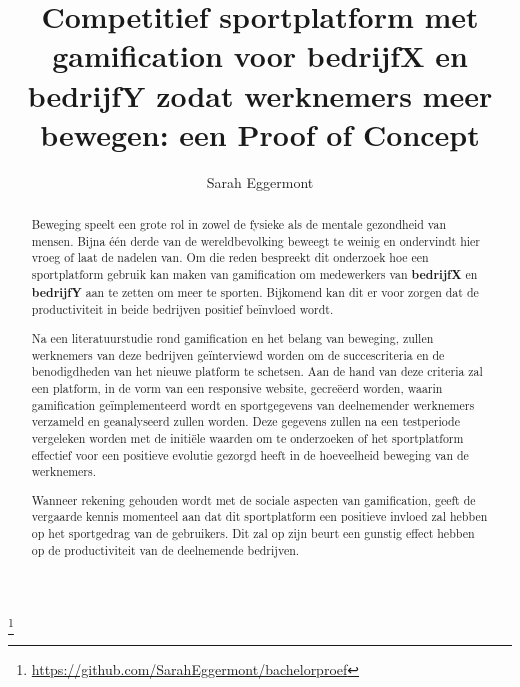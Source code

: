 \documentclass{hogent-article}
\title{Competitief sportplatform met gamification voor \textbf{bedrijfX} en \textbf{bedrijfY} zodat werknemers meer bewegen: een Proof of Concept}
\author{Sarah Eggermont}
\newcommand\blfootnote[1]{%
    \begingroup
    \renewcommand\thefootnote{}\footnote{#1}%
    \addtocounter{footnote}{-1}%
    \endgroup
}
\begin{document}
\begin{abstract}


Beweging speelt een grote rol in zowel de fysieke als de mentale gezondheid van mensen. Bijna één derde van de wereldbevolking beweegt te weinig en ondervindt hier vroeg of laat de nadelen van. Om die reden bespreekt dit onderzoek hoe een sportplatform gebruik kan maken van gamification om medewerkers van \textbf{bedrijfX} en \textbf{bedrijfY} aan te zetten om meer te sporten. Bijkomend kan dit er voor zorgen dat de productiviteit in beide bedrijven positief beïnvloed wordt.

Na een literatuurstudie rond gamification en het belang van beweging, zullen werknemers van deze bedrijven geïnterviewd worden om de succescriteria en de benodigdheden van het nieuwe platform te schetsen. Aan de hand van deze criteria zal een platform, in de vorm van een responsive website, gecreëerd worden, waarin gamification geïmplementeerd wordt en sportgegevens van deelnemender werknemers verzameld en geanalyseerd zullen worden. Deze gegevens zullen na een testperiode vergeleken worden met de initiële waarden om te onderzoeken of het sportplatform effectief voor een positieve evolutie gezorgd heeft in de hoeveelheid beweging van de werknemers.

Wanneer rekening gehouden wordt met de sociale aspecten van gamification, geeft de vergaarde kennis momenteel aan dat dit sportplatform een positieve invloed zal hebben op het sportgedrag van de gebruikers. Dit zal op zijn  beurt een gunstig effect hebben op de productiviteit van de deelnemende bedrijven.

\end{abstract}

\tableofcontents



\printbibliography[heading=bibintoc]

\blfootnote{\href{https://github.com/SarahEggermont/bachelorproef}{https://github.com/SarahEggermont/bachelorproef}}
\end{document}
